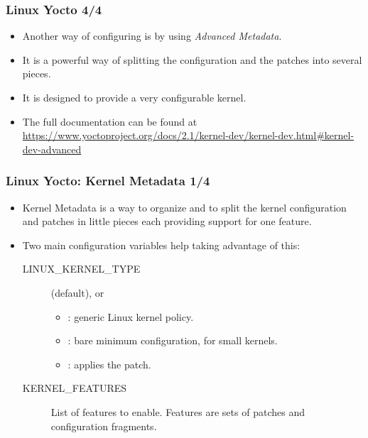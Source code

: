 \begin{frame}
  \frametitle{Linux Yocto 4/4}
  \begin{itemize}
    \item Another way of configuring  is by using
      \emph{Advanced Metadata}.
    \item It is a powerful way of splitting the configuration and the
      patches into several pieces.
    \item It is designed to provide a very configurable kernel.
    \item The full documentation can be found at
      \url{https://www.yoctoproject.org/docs/2.1/kernel-dev/kernel-dev.html\#kernel-dev-advanced}
  \end{itemize}
\end{frame}

\begin{frame}
  \frametitle{Linux Yocto: Kernel Metadata 1/4}
  \begin{itemize}
    \item Kernel Metadata is a way to organize and to split the
      kernel configuration and patches in little pieces each providing
      support for one feature.
    \item Two main configuration variables help taking advantage of
      this:
      \begin{description}
        \item[LINUX\_KERNEL\_TYPE]  (default),
           or 
          \begin{itemize}
            \item {}: generic Linux kernel policy.
            \item {}: bare minimum configuration, for small
              kernels.
            \item {}: applies the 
              patch.
          \end{itemize}
        \item[KERNEL\_FEATURES] List of features to enable. Features
          are sets of patches and configuration fragments.
      \end{description}
  \end{itemize}
\end{frame}

